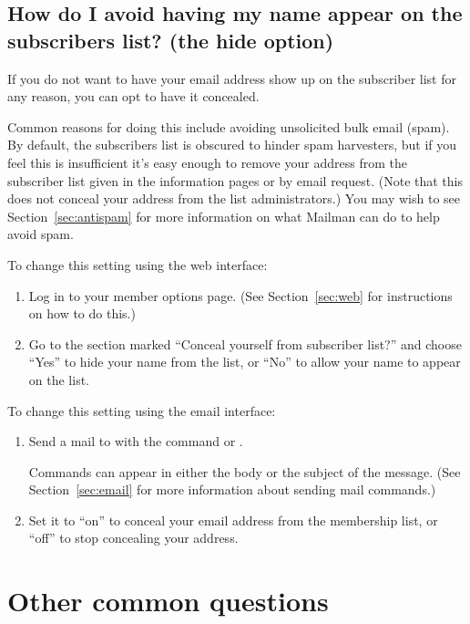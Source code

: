 \documentclass{howto}
\begin{document}
\subsection{How do I avoid having my name appear on the subscribers list?
	(the hide option)\label{sec:nolist}}

If you do not want to have your email address show up on the subscriber list
for any reason, you can opt to have it concealed.

Common reasons for doing this include avoiding unsolicited bulk email (spam).  
By default, the subscribers list is obscured to hinder spam harvesters,
but if you feel this is insufficient it's easy enough to remove your address
from the subscriber list given in the information pages or by email request.
(Note that this does not conceal your address from the list administrators.)
You may wish to see Section~\ref{sec:antispam} for more information on what
Mailman can do to help avoid spam.  

To change this setting using the web interface:
\begin{enumerate}
	\item Log in to your member options page.  (See Section~\ref{sec:web} for 
   instructions on how to do this.)
	\item Go to the section marked ``Conceal yourself from subscriber list?'' and
	choose ``Yes'' to hide your name from the list, or ``No'' to allow your name
	to appear on the list.
\end{enumerate}

To change this setting using the email interface:
\begin{enumerate} 
   \item Send a mail to  with the command
    or .

   Commands can appear 
   in either the body or the subject of the message.  (See
   Section~\ref{sec:email} for more information about sending mail
   commands.)
   \item Set it to ``on'' to conceal your email address from the membership
	list, or ``off'' to stop concealing your address.
\end{enumerate}

\section{Other common questions}
\end{document}
